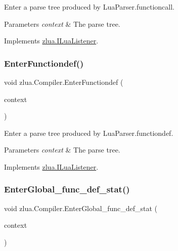 Enter a parse tree produced by Lua\+Parser.\+functioncall. 


\begin{DoxyParams}{Parameters}
{\em context} & The parse tree.\\
\hline
\end{DoxyParams}


Implements \mbox{\hyperlink{interfacezlua_1_1_i_lua_listener_aed7b99a3790f95b4b5e3d7cac6d3361d}{zlua.\+I\+Lua\+Listener}}.

\mbox{\label{classzlua_1_1_compiler_a2e238ee43fa902a36201d2cae25375a1}} 
\subsubsection{\texorpdfstring{Enter\+Functiondef()}{EnterFunctiondef()}}
{\footnotesize\ttfamily void zlua.\+Compiler.\+Enter\+Functiondef (\begin{DoxyParamCaption}\item[{\mbox{[}\+Not\+Null\mbox{]} \mbox{\hyperlink{classzlua_1_1_lua_parser_1_1_functiondef_context}{Lua\+Parser.\+Functiondef\+Context}}}]{context }\end{DoxyParamCaption})}



Enter a parse tree produced by Lua\+Parser.\+functiondef. 


\begin{DoxyParams}{Parameters}
{\em context} & The parse tree.\\
\hline
\end{DoxyParams}


Implements \mbox{\hyperlink{interfacezlua_1_1_i_lua_listener_af2184c75516162b18685ef6dce9e9047}{zlua.\+I\+Lua\+Listener}}.

\mbox{\label{classzlua_1_1_compiler_a895f16e966c211610d41e577ea359ed4}} 
\subsubsection{\texorpdfstring{Enter\+Global\+\_\+func\+\_\+def\+\_\+stat()}{EnterGlobal\_func\_def\_stat()}}
{\footnotesize\ttfamily void zlua.\+Compiler.\+Enter\+Global\+\_\+func\+\_\+def\+\_\+stat (\begin{DoxyParamCaption}\item[{\mbox{[}\+Not\+Null\mbox{]} \mbox{\hyperlink{classzlua_1_1_lua_parser_1_1_global__func__def__stat_context}{Lua\+Parser.\+Global\+\_\+func\+\_\+def\+\_\+stat\+Context}}}]{context }\end{DoxyParamCaption})}



